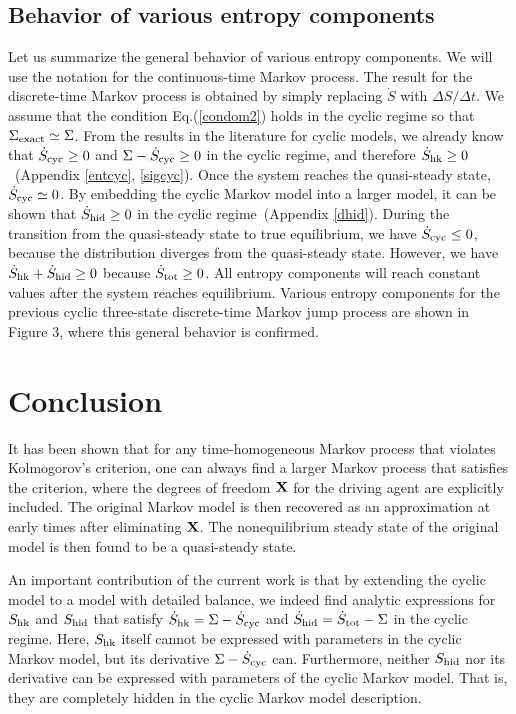 \documentclass[aps,pre,amsmath,amssymb,floatfix,preprint,nofootinbib]{revtex4}
\begin{document}
\subsection{Behavior of various entropy components}
Let us summarize the general behavior of various entropy components. We will use the notation for the continuous-time Markov process. The result for the discrete-time Markov process is obtained by simply replacing $\dot S$ with $\Delta S/\Delta t$. We assume that the condition Eq.(\ref{condom2}) holds in the cyclic regime so that $\Sigma_{\rm exact} \simeq \Sigma$. From the results in the literature for cyclic models\cite{hg,gq,morimoto,zmh}, we already know that $\dot S_{\rm cyc} \ge 0$ and $\Sigma-\dot S_{\rm cyc} \ge 0$ in the cyclic regime, and therefore $\dot S_{\rm hk} \ge 0$~(Appendix \ref{entcyc}, \ref{sigcyc}). Once the system reaches the quasi-steady state, $\dot S_{\rm cyc} \simeq 0$.   By embedding the cyclic Markov model into a larger model, it can be shown that $\dot S_{\rm hid} \ge 0$ in the cyclic regime~(Appendix \ref{dhid}). During the transition from the quasi-steady state to true equilibrium, we have $\dot S_{\rm cyc} \le 0$, because the distribution diverges from the quasi-steady state. However, we have $\dot S_{\rm hk} + \dot S_{\rm hid} \ge 0$ because $\dot S_{\rm tot} \ge 0$. All entropy components will reach constant values after the system reaches equilibrium. Various entropy components for the previous cyclic three-state discrete-time Markov jump process are shown in Figure 3, where this general behavior is confirmed. 

\section{Conclusion}
  It has been shown that for any time-homogeneous Markov process that violates Kolmogorov's criterion, one can always find a larger Markov process that satisfies the criterion, where the degrees of freedom ${\bf X}$ for the driving agent are explicitly included. The original Markov model is then recovered as an approximation at early times after eliminating ${\bf X}$. The nonequilibrium steady state of the original model is then found to be a quasi-steady state.  
  
   An important contribution of the current work is that by extending the cyclic model to a model with detailed balance, we indeed find analytic expressions for $S_{\rm hk}$ and $S_{\rm hid}$ that satisfy $\dot S_{\rm hk}  = \Sigma - \dot S_{\rm cyc}$ and $\dot S_{\rm hid} = \dot S_{\rm tot} - \Sigma$ in the cyclic regime. Here, $S_{\rm hk}$ itself cannot be expressed with parameters in the cyclic Markov model,  but its derivative $\Sigma - \dot S_{\rm cyc}$ can. Furthermore, neither $S_{\rm hid}$ nor its derivative can be expressed with parameters of the cyclic Markov model. That is, they are completely hidden in the cyclic Markov model description.
  
\end{document}
